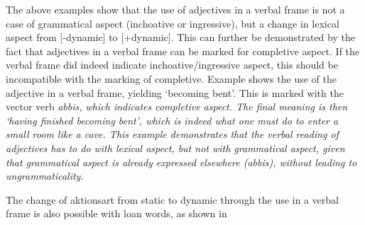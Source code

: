 


The above examples show that the use of adjectives in a verbal frame is  not a case of grammatical aspect (inchoative or ingressive), but a change in lexical aspect from [-dynamic] to [+dynamic]. This can further be demonstrated by the fact that adjectives in a verbal frame can be marked for completive aspect. If the verbal frame did indeed indicate inchoative/ingressive aspect, this should be incompatible with the marking of completive. Example  shows the use of the adjective  in a verbal frame, yielding `becoming bent'. This is marked with the vector verb \em abbis\em, which indicates completive aspect. The final meaning is then `having finished becoming bent', which is indeed what one must do to enter a small room like a cave. This example demonstrates that the verbal reading of adjectives has to do with lexical aspect, but not with grammatical aspect, given that grammatical aspect is already expressed elsewhere (\em abbis\em), without leading to ungrammaticality.


%

The change of aktionsart from static to dynamic through the use in a verbal frame is also possible with loan words, as shown in 

